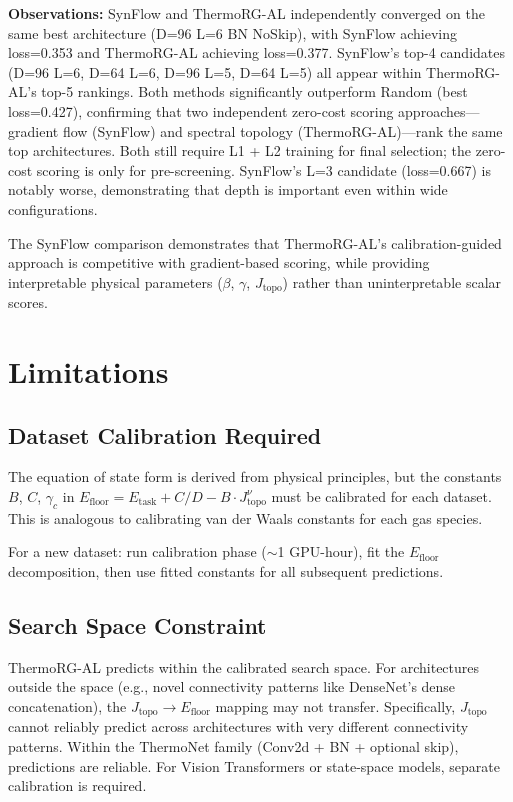 \documentclass[11pt, a4paper]{article}
\theoremstyle{plain}
\begin{document}
\textbf{Observations:} SynFlow and ThermoRG-AL independently converged on the same best architecture (D=96 L=6 BN NoSkip), with SynFlow achieving loss=0.353 and ThermoRG-AL achieving loss=0.377. SynFlow's top-4 candidates (D=96 L=6, D=64 L=6, D=96 L=5, D=64 L=5) all appear within ThermoRG-AL's top-5 rankings. Both methods significantly outperform Random (best loss=0.427), confirming that two independent zero-cost scoring approaches---gradient flow (SynFlow) and spectral topology (ThermoRG-AL)---rank the same top architectures. Both still require L1 + L2 training for final selection; the zero-cost scoring is only for pre-screening. SynFlow's L=3 candidate (loss=0.667) is notably worse, demonstrating that depth is important even within wide configurations.

The SynFlow comparison demonstrates that ThermoRG-AL's calibration-guided approach is competitive with gradient-based scoring, while providing interpretable physical parameters ($\beta$, $\gamma$, $J_{\mathrm{topo}}$) rather than uninterpretable scalar scores.
\section{Limitations}\label{sec:limitations}

\subsection{Dataset Calibration Required}
The equation of state form is derived from physical principles, but the constants $B$, $C$, $\gamma_c$ in $E_{\mathrm{floor}} = E_{\mathrm{task}} + C/D - B \cdot J_{\mathrm{topo}}^{\nu}$ must be calibrated for each dataset. This is analogous to calibrating van der Waals constants for each gas species.

For a new dataset: run calibration phase ($\sim$1 GPU-hour), fit the $E_{\mathrm{floor}}$ decomposition, then use fitted constants for all subsequent predictions.

\subsection{Search Space Constraint}
ThermoRG-AL predicts within the calibrated search space. For architectures outside the space (e.g., novel connectivity patterns like DenseNet's dense concatenation), the $J_{\mathrm{topo}} \to E_{\mathrm{floor}}$ mapping may not transfer. Specifically, $J_{\mathrm{topo}}$ cannot reliably predict across architectures with very different connectivity patterns. Within the ThermoNet family (Conv2d + BN + optional skip), predictions are reliable. For Vision Transformers or state-space models, separate calibration is required.
\end{document}
